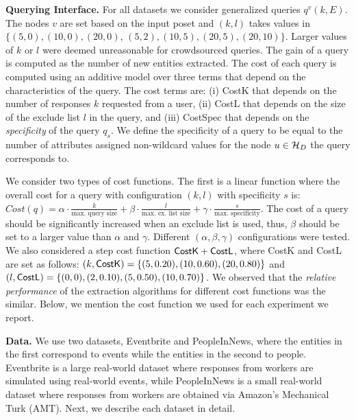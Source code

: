 \noindent\textbf{Querying Interface.} For all datasets we consider generalized queries $q^v(k,E)$. The nodes $v$ are set based on the input poset and $(k,l)$ takes values in {\small $\{(5,0), (10,0), (20,0)$, $(5,2), (10,5), (20,5), (20,10)\}$}. \iftr 
Larger values of $k$ or $l$ were deemed unreasonable for crowdsourced queries. The gain of a query is computed as the number of new entities extracted. 
\fi 
The cost of each query is computed using an additive model over three terms that depend on the characteristics of the query. 
The cost terms are: (i) {\sf CostK} that depends on the number of responses $k$ requested from a user, (ii) {\sf CostL} that depends on the size of the exclude list $l$ in the query, and (iii) {\sf CostSpec} that depends on the {\em specificity} of the query $q_s$. We define the specificity of a query to be equal to the number of attributes assigned non-wildcard values for the node $u \in \mathcal{H}_D$ the query corresponds to. 

We consider two types of cost functions. The first is a linear function where the overall cost for a query with configuration $(k,l)$ with specificity $s$ is:{\scriptsize $Cost(q) = \alpha \cdot \frac{k}{\mbox{max. query size}} + \beta \cdot  \frac{l}{\mbox{max. ex. list size}} + \gamma \cdot  \frac{s}{\mbox{max. specificity}} $}. The cost of a query should be significantly increased when an exclude list is used, thus, $\beta$ should be set to a larger value than $\alpha$ and $\gamma$. Different $(\alpha, \beta, \gamma)$ configurations were tested. We also considered a step cost function ${\sf CostK} + {\sf CostL}$, where {\sf CostK} and {\sf CostL} are set as follows: $(k,{\sf CostK}) = \{(5,0.20), (10,0.60), (20,0.80)\}$ and $(l,{\sf CostL}) = \{(0,0), (2,0.10), (5,0.50), (10,0.70)\}$. We observed that the {\em relative performance} of the extraction algorithms for different cost functions was the similar. Below, we mention the cost function we used for each experiment we report. 

\noindent\textbf{Data.} We use two datasets, Eventbrite and PeopleInNews, where the entities in the first correspond to events while the entities in the second to people. Eventbrite is a large real-world dataset where responses from workers are simulated using real-world events, while PeopleInNews is a small real-world dataset where responses from workers are obtained via Amazon's Mechanical Turk (AMT). Next, we describe each dataset in detail.

